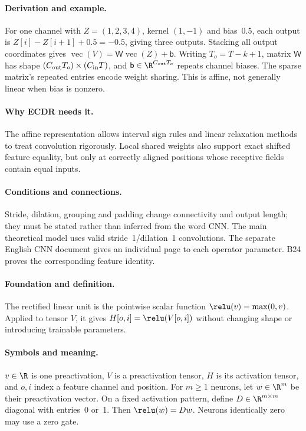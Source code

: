 \paragraph{Derivation and example.}
For one channel with $Z=(1,2,3,4)$, kernel $(1,-1)$ and bias~0.5,
each output is $Z[i]-Z[i+1]+0.5=-0.5$, giving three outputs. Stacking
all output coordinates gives $\operatorname{vec}(V)=\mathsf W\operatorname{vec}(Z)+\mathsf b$.
Writing $T_o=T-k+1$, matrix $\mathsf W$ has shape
$(C_{\rm out}T_o)\times(C_{\rm in}T)$, and $\mathsf b\in\R^{C_{\rm out}T_o}$
repeats channel biases. The sparse matrix's repeated entries encode weight
sharing. This is affine, not generally linear when bias is nonzero.
\paragraph{Why ECDR needs it.}
The affine representation allows interval sign rules and linear
relaxation methods to treat convolution rigorously. Local shared weights
also support exact shifted feature equality, but only at correctly aligned
positions whose receptive fields contain equal inputs.
\paragraph{Conditions and connections.}
Stride, dilation, grouping and padding change connectivity and output
length; they must be stated rather than inferred from the word CNN.
The main theoretical model uses valid stride~1/dilation~1 convolutions.
The separate English CNN document gives an individual page to each
operator parameter. B24 proves the corresponding feature identity.

\paragraph{Foundation and definition.}
The rectified linear unit is the pointwise scalar function
$\relu(v)=\max(0,v)$. Applied to tensor $V$, it gives $H[o,i]=\relu(V[o,i])$
without changing shape or introducing trainable parameters.
\paragraph{Symbols and meaning.}
$v\in\R$ is one preactivation, $V$ is a preactivation tensor, $H$ is
its activation tensor, and $o,i$ index a feature channel and position.
For $m\ge1$ neurons, let $w\in\R^m$ be their preactivation vector.
On a fixed activation pattern, define $D\in\R^{m\times m}$ diagonal
with entries~0 or~1. Then $\relu(w)=Dw$. Neurons identically zero may use a zero gate.
